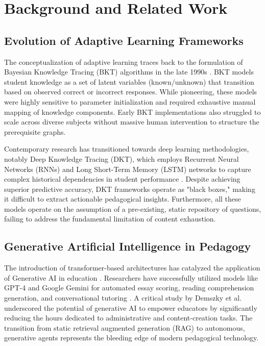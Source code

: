 \documentclass[conference]{IEEEtran}
\begin{document}
\section{Background and Related Work}

\subsection{Evolution of Adaptive Learning Frameworks}
The conceptualization of adaptive learning traces back to the formulation of Bayesian Knowledge Tracing (BKT) algorithms in the late 1990s \cite{corbett1997knowledge}. BKT models student knowledge as a set of latent variables (known/unknown) that transition based on observed correct or incorrect responses. While pioneering, these models were highly sensitive to parameter initialization and required exhaustive manual mapping of knowledge components. Early BKT implementations also struggled to scale across diverse subjects without massive human intervention to structure the prerequisite graphs.

Contemporary research has transitioned towards deep learning methodologies, notably Deep Knowledge Tracing (DKT), which employs Recurrent Neural Networks (RNNs) and Long Short-Term Memory (LSTM) networks to capture complex historical dependencies in student performance \cite{piech2015deep}. Despite achieving superior predictive accuracy, DKT frameworks operate as "black boxes," making it difficult to extract actionable pedagogical insights. Furthermore, all these models operate on the assumption of a pre-existing, static repository of questions, failing to address the fundamental limitation of content exhaustion.

\subsection{Generative Artificial Intelligence in Pedagogy}
The introduction of transformer-based architectures has catalyzed the application of Generative AI in education \cite{brown2020language}. Researchers have successfully utilized models like GPT-4 and Google Gemini for automated essay scoring, reading comprehension generation, and conversational tutoring \cite{wang2023evaluating}. A critical study by Demszky et al. \cite{demszky2023empowering} underscored the potential of generative AI to empower educators by significantly reducing the hours dedicated to administrative and content-creation tasks. The transition from static retrieval augmented generation (RAG) to autonomous, generative agents represents the bleeding edge of modern pedagogical technology.
\end{document}
